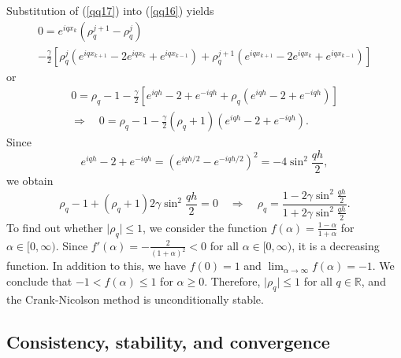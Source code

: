    
Substitution of (\ref{qq17}) into (\ref{qq16})
yields
\begin{multline}
0=e^{iqx_{k}}\left(\rho_{q}^{j+1}-\rho_{q}^{j}\right)\\
-\frac{\gamma}{2}\left[\rho_{q}^{j}
\left(e^{iqx_{k+1}}-2e^{iqx_{k}}+e^{iqx_{k-1}}\right)
+\rho_{q}^{j+1}\left(e^{iqx_{k+1}}-2e^{iqx_{k}}+e^{iqx_{k-1}}\right)
\right]
\end{multline}
or
\begin{multline*}
0=\rho_{q}-1- \frac{\gamma}{2} \left[e^{iqh}-2+e^{-iqh}+
\rho_{q}\left(e^{iqh}-2+e^{-iqh}\right) \right]\\
\Rightarrow
\quad 0=\rho_{q}-1-
\frac{\gamma}{2}(\rho_{q}+1)\left(e^{iqh}-2+e^{-iqh}\right).
\end{multline*}
Since
\[
e^{iqh}-2+e^{-iqh}=\left(e^{iqh/2}-e^{-iqh/2}\right)^{2}=-4\sin^{2}
\frac{qh}{2},
\]
we obtain
\[
\rho_{q}-1+(\rho_{q}+1) 2\gamma\sin^{2} \frac{qh}{2}=0 \quad
\Rightarrow \quad \rho_{q}=\frac{1-2\gamma\sin^{2}
\frac{qh}{2}}{1+2\gamma\sin^{2} \frac{qh}{2}}.
\]
To find out whether $\vert\rho_{q}\vert \leq 1$, we consider the function
$f(\alpha)=\frac{1-\alpha}{1+\alpha}$ for $\alpha\in[0,\infty)$. Since
$f'(\alpha)=-\frac{2}{(1+\alpha)^2} < 0$ for all $\alpha\in[0,\infty)$,
it is a decreasing function.
In addition to this, we have $f(0)=1$ and $\lim_{\alpha\to\infty}f(\alpha)=-1$.
We conclude that
$-1< f(\alpha) \leq 1$ for $\alpha\geq 0$. Therefore, $\vert\rho_{q}\vert \leq 1$
for all $q\in\mathbb{R}$, and
the Crank-Nicolson method is unconditionally stable.






\subsection{Consistency, stability, and convergence}


